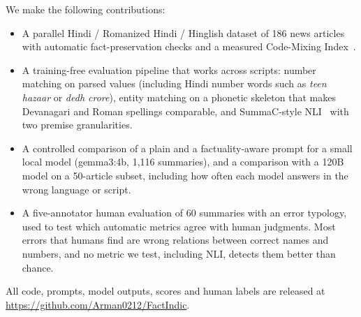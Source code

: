 We make the following contributions:
\begin{itemize}
  \item A parallel Hindi / Romanized Hindi / Hinglish dataset of 186 news articles with automatic fact-preservation checks and a measured Code-Mixing Index~\cite{das2014identifying}.
  \item A training-free evaluation pipeline that works across scripts: number matching on parsed values (including Hindi number words such as \emph{teen hazaar} or \emph{dedh crore}), entity matching on a phonetic skeleton that makes Devanagari and Roman spellings comparable, and SummaC-style NLI~\cite{laban2022summac} with two premise granularities.
  \item A controlled comparison of a plain and a factuality-aware prompt for a small local model (gemma3:4b, 1,116 summaries), and a comparison with a 120B model on a 50-article subset, including how often each model answers in the wrong language or script.
  \item A five-annotator human evaluation of 60 summaries with an error typology, used to test which automatic metrics agree with human judgments. Most errors that humans find are wrong relations between correct names and numbers, and no metric we test, including NLI, detects them better than chance.
\end{itemize}

All code, prompts, model outputs, scores and human labels are released at \url{https://github.com/Arman0212/FactIndic}.
